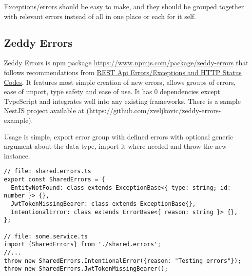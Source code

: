 Exceptions/errors should be easy to make, and they should be grouped together with relevant
errors instead of all in one place or each for it self.

\subsection{Zeddy Errors}\label{subsec:zeddy-errors}

Zeddy Errors is npm package \href{https://www.npmjs.com/package/zeddy-errors}{https://www.npmjs.com/package/zeddy-errors}
that follows recommendations from \hyperref[sec:REST Api Errors/Exceptions and HTTP Status Codes]{REST Api Errors/Exceptions and HTTP Status Codes}.
It features most simple creation of new errors, allows groups of errors, ease of import, type safety and ease of use.
It has 0 dependencies except TypeScript and integrates well into any existing frameworks.
There is a sample NestJS project available at
\href{https://github.com/zveljkovic/zeddy-errors-example}(https://github.com/zveljkovic/zeddy-errors-example).

Usage is simple, export error group with defined errors with optional generic argument about the data type,
import it where needed and throw the new instance.

\begin{verbatim}
// file: shared.errors.ts
export const SharedErrors = {
  EntityNotFound: class extends ExceptionBase<{ type: string; id: number }> {},
  JwtTokenMissingBearer: class extends ExceptionBase{},
  IntentionalError: class extends ErrorBase<{ reason: string }> {},
};

// file: some.service.ts
import {SharedErrors} from './shared.errors';
//...
throw new SharedErrors.IntentionalError({reason: "Testing errors"});
throw new SharedErrors.JwtTokenMissingBearer();

\end{verbatim}